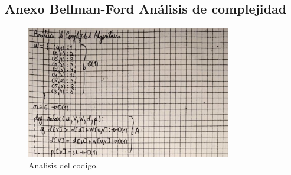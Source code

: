 \subsection{Anexo Bellman-Ford Análisis de complejidad}
\begin{figure}[H]
	\centering
	\includegraphics[width=0.8\textwidth]{complejidad_distancia_ejem2_1.png}
	\caption{Analisis del codigo.}
	\label{fig:complejidad1}
\end{figure}

